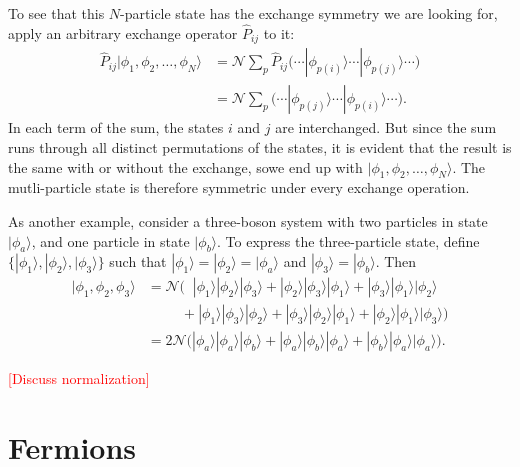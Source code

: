 \documentclass[pra,12pt]{revtex4}
\begin{document}
To see that this $N$-particle state has the exchange symmetry we are
looking for, apply an arbitrary exchange operator $\hat{P}_{ij}$ to it:
$$\begin{aligned}\hat{P}_{ij}|\phi_1,\phi_2,\dots,\phi_N\rangle &= \mathcal{N} \sum_p \hat{P}_{ij} \Big(\cdots  |\phi_{p(i)}\rangle  \cdots  |\phi_{p(j)}\rangle\cdots\Big) \\&= \mathcal{N} \sum_p \Big(\cdots  |\phi_{p(j)}\rangle  \cdots  |\phi_{p(i)}\rangle\cdots\Big).\end{aligned}$$
In each term of the sum, the states $i$ and $j$ are interchanged.  But
since the sum runs through all distinct permutations of the states, it
is evident that the result is the same with or without the exchange,
sowe end up with $|\phi_1,\phi_2,\dots,\phi_N\rangle$.  The
mutli-particle state is therefore symmetric under every exchange
operation.

As another example, consider a three-boson system with two particles
in state $|\phi_a\rangle$, and one particle in state $|\phi_b\rangle$.
To express the three-particle state, define $\{|\phi_1\rangle,
|\phi_2\rangle, |\phi_3\rangle\}$ such that $|\phi_1\rangle =
|\phi_2\rangle = |\phi_a\rangle$ and $|\phi_3\rangle =
|\phi_b\rangle$.  Then
$$\begin{aligned}|\phi_1,\phi_2,\phi_3\rangle &= \mathcal{N} \Big( \;\;
|\phi_1\rangle|\phi_2\rangle|\phi_3\rangle +
|\phi_2\rangle|\phi_3\rangle|\phi_1\rangle +
|\phi_3\rangle|\phi_1\rangle|\phi_2\rangle \\ &\qquad\;\, +
|\phi_1\rangle|\phi_3\rangle|\phi_2\rangle +
|\phi_3\rangle|\phi_2\rangle|\phi_1\rangle +
|\phi_2\rangle|\phi_1\rangle|\phi_3\rangle\Big) \\
&= 2\mathcal{N} \Big(
|\phi_a\rangle|\phi_a\rangle|\phi_b\rangle +
|\phi_a\rangle|\phi_b\rangle|\phi_a\rangle +
|\phi_b\rangle|\phi_a\rangle|\phi_a\rangle\Big).
\end{aligned}$$

\textcolor{red}{[Discuss normalization]}

\section{Fermions}
\end{document}
